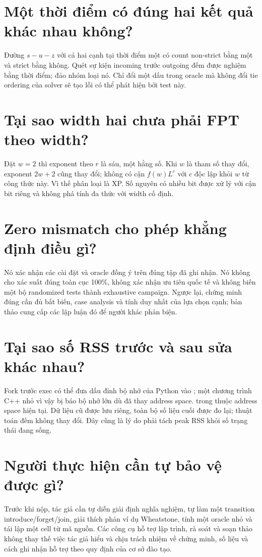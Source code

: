 \section{Một thời điểm có đúng hai kết quả khác nhau không?}

Đường $s-u-z$ với cả hai cạnh tại thời điểm một có count non-strict bằng một và strict bằng không. Quét sự kiện incoming trước outgoing đếm được nghiệm bằng thời điểm; đảo nhóm loại nó. Chỉ đổi một dấu trong oracle mà không đổi tie ordering của solver sẽ tạo lỗi có thể phát hiện bởi test này.

\section{Tại sao width hai chưa phải FPT theo width?}

Đặt $w=2$ thì exponent theo $r$ là sáu, một hằng số. Khi $w$ là tham số thay đổi, exponent $2w+2$ cũng thay đổi; không có cận $f(w)L^c$ với $c$ độc lập khỏi $w$ từ công thức này. Vì thế phân loại là XP. Số nguyên có nhiều bit được xử lý với cận bit riêng và không phá tính đa thức với width cố định.

\section{Zero mismatch cho phép khẳng định điều gì?}

Nó xác nhận các cài đặt và oracle đồng ý trên đúng tập đã ghi nhận. Nó không cho xác suất đúng toàn cục 100\%, không xác nhận ưu tiên quốc tế và không biến một bộ randomized tests thành exhaustive campaign. Ngược lại, chứng minh đúng cần đủ bất biến, case analysis và tính duy nhất của lựa chọn cạnh; bản thảo cung cấp các lập luận đó để người khác phản biện.

\section{Tại sao số RSS trước và sau sửa khác nhau?}

Fork trước exec có thể đưa dấu đỉnh bộ nhớ của Python vào ; một chương trình C++ nhỏ vì vậy bị báo bộ nhớ lớn dù đã thay address space.  trong  thuộc address space hiện tại. Dữ liệu cũ được lưu riêng, toàn bộ số liệu cuối được đo lại; thuật toán đếm không thay đổi. Đây cũng là lý do phải tách peak RSS khỏi số trạng thái đang sống.

\section{Người thực hiện cần tự bảo vệ được gì?}

Trước khi nộp, tác giả cần tự diễn giải định nghĩa nghiệm, tự làm một transition introduce/forget/join, giải thích phản ví dụ Wheatstone, tính một oracle nhỏ và tái lập một cell từ mã nguồn. Các công cụ hỗ trợ lập trình, rà soát và soạn thảo không thay thế việc tác giả hiểu và chịu trách nhiệm về chứng minh, số liệu và cách ghi nhận hỗ trợ theo quy định của cơ sở đào tạo.
